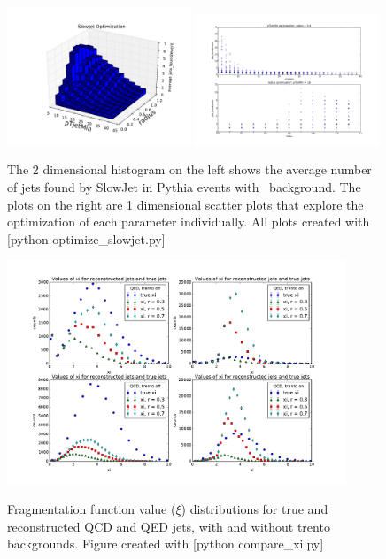 \documentclass[11pt]{article}
\begin{document}
\begin{figure}[h]
\begin{center}
\includegraphics[width=0.49\textwidth]{optimize_slowjet1.pdf}
\includegraphics[width=0.49\textwidth]{optimize_slowjet2.pdf}
\label{fig_label}
\caption{The 2 dimensional histogram on the left shows the average number of jets found by SlowJet in Pythia events with \trento\ background. The plots on the right are 1 dimensional scatter plots that explore the optimization of each parameter individually. All plots created with [python optimize\_slowjet.py]}
\end{center}
\end{figure}

\begin{figure}[h]
\begin{center}
\includegraphics[width=0.9\textwidth]{compare_xi.pdf}
\label{fig_label}
\caption{Fragmentation function value ($\xi$) distributions for true and reconstructed QCD and QED jets, with and without trento backgrounds.  Figure created with [python compare\_xi.py]}
\end{center}
\end{figure}
\end{document}
